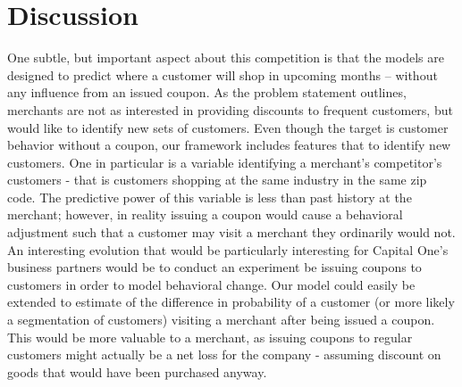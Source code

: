 \documentclass[12pt]{article} %
\begin{document}
\section{Discussion}
One subtle, but important aspect about this competition is that the models are designed to predict where a customer will shop in upcoming months -- without any influence from an issued coupon.  As the problem statement outlines, merchants are not as interested in providing discounts to frequent customers, but would like to identify new sets of customers.  Even though the target is customer behavior without a coupon, our framework includes features that to identify new customers.  One in particular is a variable identifying a merchant's competitor's customers - that is customers shopping at the same industry in the same zip code.  The predictive power of this variable is less than past history at the merchant; however, in reality issuing a coupon would cause a behavioral adjustment such that a customer may visit a merchant they ordinarily would not.  An interesting evolution that would be particularly interesting for Capital One's business partners would be to conduct an experiment be issuing coupons to customers in order to model behavioral change.  Our model could easily be extended to estimate of the difference in probability of a customer (or more likely a segmentation of customers)  visiting a merchant after being issued a coupon.  This would be more valuable to a merchant, as issuing coupons to regular customers might actually be a net loss for the company - assuming discount on goods that would have been purchased anyway. 
\end{document}
